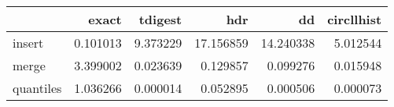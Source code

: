 \begin{tabular}{lrrrrr}
\toprule
{} &     exact &   tdigest &        hdr &         dd &  circllhist \\
\midrule
insert    &  0.101013 &  9.373229 &  17.156859 &  14.240338 &    5.012544 \\
merge     &  3.399002 &  0.023639 &   0.129857 &   0.099276 &    0.015948 \\
quantiles &  1.036266 &  0.000014 &   0.052895 &   0.000506 &    0.000073 \\
\bottomrule
\end{tabular}
